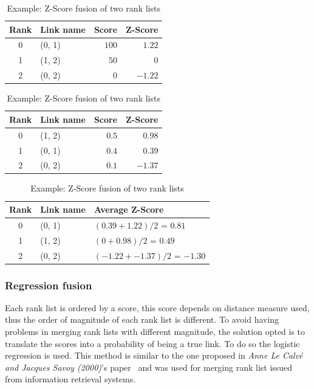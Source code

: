 \begin{table}
  \centering
  \caption{Example: Z-Score fusion of two rank lists}
  \label{tab:example_z_score_fusion}

  \label{}
  \begin{tabular}{c l r r}
    \toprule
    Rank & Link name & Score & Z-Score \\
    \midrule
    0 & (0, 1) & $100$ & $1.22$ \\
    1 & (1, 2) & $50$ & $0$ \\
    2 & (0, 2) & $0$ & $-1.22$ \\
    \bottomrule
  \end{tabular}

  \vspace{0.5cm}

  \label{}
  \begin{tabular}{c l r r}
    \toprule
    Rank & Link name & Score & Z-Score \\
    \midrule
    0 & (1, 2) & $0.5$ & $0.98$ \\
    1 & (0, 1) & $0.4$ & $0.39$ \\
    2 & (0, 2) & $0.1$ & $-1.37$ \\
    \bottomrule
  \end{tabular}

  \vspace{0.5cm}

  \label{}
  \begin{tabular}{c l l}
    \toprule
    Rank & Link name & Average Z-Score \\
    \midrule
    0 & (0, 1) & $(0.39 + 1.22) / 2$ = $0.81$ \\
    1 & (1, 2) & $(0 + 0.98) / 2$ = $0.49$ \\
    2 & (0, 2) & $(-1.22 + -1.37) / 2$ = $-1.30$ \\
    \bottomrule
  \end{tabular}

\end{table}

\subsubsection{Regression fusion \label{sec:regression_fusion}}

Each rank list is ordered by a score, this score depends on distance measure used, thus the order of magnitude of each rank list is different.
To avoid having problems in merging rank lists with different magnitude, the solution opted is to translate the scores into a probability of being a true link.
To do so the logistic regression is used.
This method is similar to the one proposed in \textit{Anne Le Calvé and Jacques Savoy (2000)}'s paper~\cite{le_calve_database_merging} and was used for merging rank list issued from information retrieval systems.

